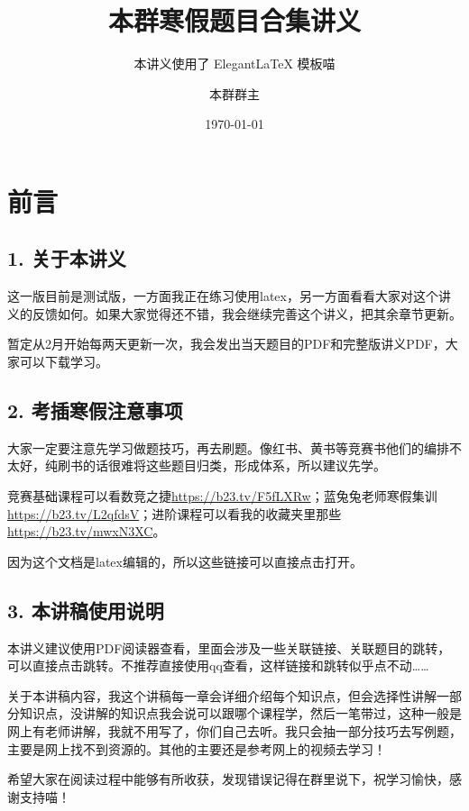 \documentclass[lang=cn,newtx,10pt,scheme=chinese]{elegantbook}
\title{本群寒假题目合集讲义} %
\subtitle{本讲义使用了 Elegant\LaTeX{} 模板喵 }
\author{本群群主}
\institute{本群}
\date{\today}
\begin{document}
\maketitle
\frontmatter

\newpage

\section*{前言}

\subsection*{\textbf{1. 关于本讲义}}
这一版目前是测试版，一方面我正在练习使用latex，另一方面看看大家对这个讲义的反馈如何。如果大家觉得还不错，我会继续完善这个讲义，把其余章节更新。

暂定从2月开始每两天更新一次，我会发出当天题目的PDF和完整版讲义PDF，大家可以下载学习。

\subsection*{\textbf{2. 考插寒假注意事项}}
大家一定要注意先学习做题技巧，再去刷题。像红书、黄书等竞赛书他们的编排不太好，纯刷书的话很难将这些题目归类，形成体系，所以建议先学。

竞赛基础课程可以看数竞之捷\url{https://b23.tv/F5fLXRw}；蓝兔兔老师寒假集训\url{https://b23.tv/L2qfdsV}；进阶课程可以看我的收藏夹里那些\url{https://b23.tv/mwxN3XC}。

因为这个文档是latex编辑的，所以这些链接可以直接点击打开。

\subsection*{\textbf{3. 本讲稿使用说明}}
本讲义建议使用PDF阅读器查看，里面会涉及一些关联链接、关联题目的跳转，可以直接点击跳转。不推荐直接使用qq查看，这样链接和跳转似乎点不动……

关于本讲稿内容，我这个讲稿每一章会详细介绍每个知识点，但会选择性讲解一部分知识点，没讲解的知识点我会说可以跟哪个课程学，然后一笔带过，这种一般是网上有老师讲解，我就不用写了，你们自己去听。我只会抽一部分技巧去写例题，主要是网上找不到资源的。其他的主要还是参考网上的视频去学习！

希望大家在阅读过程中能够有所收获，发现错误记得在群里说下，祝学习愉快，感谢支持喵！
\newpage

\tableofcontents
\mainmatter


\newpage


\newpage

\end{document}
